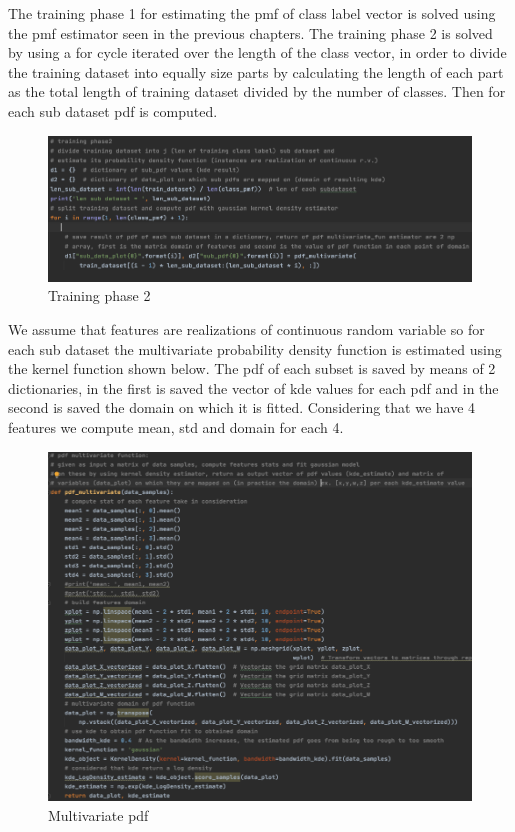 \documentclass[12pt]{report}
\begin{document}
The training phase 1 for estimating the pmf of class label vector is solved using the pmf estimator seen in the previous chapters.
The training phase 2 is solved by using a for cycle iterated over the length of the class vector, in order to divide the training dataset into equally size parts by calculating the length of each part as the total length of training dataset divided by the number of classes. Then for each sub dataset pdf is computed.

\begin{figure}[h!]
    \centering
    \includegraphics[width=15cm]{Pictures/training phase 2.png}
    \caption{Training phase 2}
\end{figure}

\newpage
We assume that features are realizations of continuous random variable so for each sub dataset the multivariate probability density function is estimated using the kernel function shown below. The pdf of each subset is saved by means of 2 dictionaries, in the first is saved the vector of kde values for each pdf and in the second is saved the domain on which it is fitted. Considering that we have 4 features we compute mean, std and domain for each 4.

\begin{figure}[h!]
    \centering
    \includegraphics[width=15cm]{Pictures/pdf multivariate.png}
    \caption{Multivariate pdf}
\end{figure}
\end{document}
